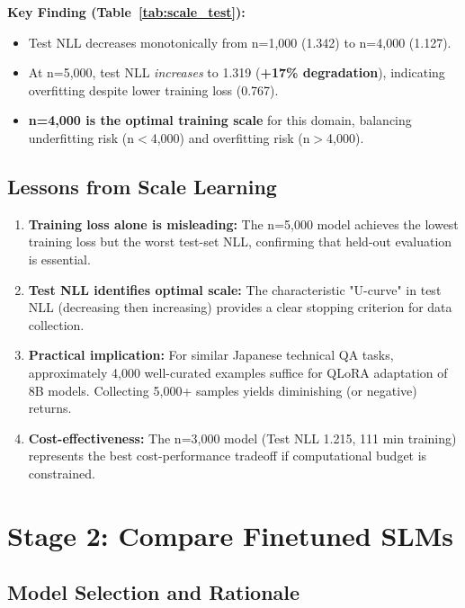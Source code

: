 \documentclass[twocolumn]{article}
\begin{document}
\textbf{Key Finding (Table~\ref{tab:scale_test}):}
\begin{itemize}
  \item Test NLL decreases monotonically from n=1,000 (1.342) to n=4,000 (1.127).
  \item At n=5,000, test NLL \emph{increases} to 1.319 (\textbf{+17\% degradation}),
        indicating overfitting despite lower training loss (0.767).
  \item \textbf{n=4,000 is the optimal training scale} for this domain, balancing
        underfitting risk (n$<$4,000) and overfitting risk (n$>$4,000).
\end{itemize}

\subsection{Lessons from Scale Learning}

\begin{enumerate}
  \item \textbf{Training loss alone is misleading:} The n=5,000 model achieves the lowest
        training loss but the worst test-set NLL, confirming that held-out evaluation is
        essential.
  \item \textbf{Test NLL identifies optimal scale:} The characteristic "U-curve" in test NLL
        (decreasing then increasing) provides a clear stopping criterion for data collection.
  \item \textbf{Practical implication:} For similar Japanese technical QA tasks, approximately
        4,000 well-curated examples suffice for QLoRA adaptation of 8B models. Collecting
        5,000+ samples yields diminishing (or negative) returns.
  \item \textbf{Cost-effectiveness:} The n=3,000 model (Test NLL 1.215, 111 min training)
        represents the best cost-performance tradeoff if computational budget is constrained.
\end{enumerate}

\section{Stage 2: Compare Finetuned SLMs}
\label{sec:multimodel}

\subsection{Model Selection and Rationale}
\end{document}
